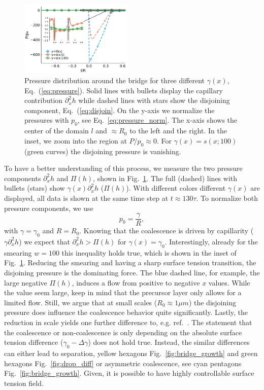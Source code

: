 \documentclass[twocolumn,amsmath,amssymb,showpacs,pre,nofootinbib,superscriptaddress]{revtex4-1} %
\begin{document}
\begin{figure}
    \centering
    \includegraphics[width=0.48\textwidth]{Figures/pressures_three_gam_end.pdf}
    \caption{Pressure distribution around the bridge for three different $\gamma(x)$, Eq.~(\ref{eq:pressure}).
    Solid lines with bullets display the capillary contribution $\partial_x^2 h$ while dashed lines with stars show the disjoining component, Eq.~(\ref{eq:disjoin}.
    On the y-axis we normalize the pressures with $p_0$, see Eq.~\ref{eq:pressure_norm}.
    The x-axis shows the center of the domain $l$ and $\approx R_0$ to the left and the right.
    In the inset, we zoom into the region at $P/p_0 \approx 0$. 
    For $\gamma(x) = s(x;100)$ (green curves) the disjoining pressure is vanishing.}
    \label{fig:pressures}
\end{figure}
To have a better understanding of this process, we measure the two pressure components $\partial_x^2 h$ and $\Pi(h)$, shown in Fig.~\ref{fig:pressures}.
The full (dashed) lines with bullets (stars) show $\gamma(x)\partial_x^2 h$ ($\Pi(h)$). 
With different colors different $\gamma(x)$ are displayed, all data is shown at the same time step at $t\approx 130\tau$.
To normalize both pressure components, we use 
\begin{equation}\label{eq:pressure_norm}
    p_0 = \frac{\gamma}{R},
\end{equation}
with $\gamma = \gamma_0$ and $R = R_0$.
Knowing that the coalescence is driven by capillarity ($\gamma\partial_x^2 h$) we expect that $\partial_x^2 h > \Pi(h)$ for $\gamma(x) = \gamma_0$.
Interestingly, already for the smearing $w=100$ this inequality holds true, which is shown in the inset of Fig.~\ref{fig:pressures}.
Reducing the smearing and having a sharp surface tension transition, the disjoining pressure is the dominating force.
The blue dashed line, for example, the large negative $\Pi(h)$, induces a flow from positive to negative $x$ values.
While the value seem large, keep in mind that the precursor layer only allows for a limited flow.
Still, we argue that at small scales ($R_0 \approx 1\mu m$) the disjoining pressure does influence the coalescence behavior quite significantly.
Lastly, the reduction in scale yields one further difference to, e.g. ref.~\cite{karpitschka2014sharp}.
The statement that the coalescence or non-coalescence is only depending on the absolute surface tension difference ($\gamma_0-\Delta\gamma$) does not hold true.
Instead, the similar differences can either lead to separation, yellow hexagons Fig.~\ref{fig:bridge_growth} and green hexagons Fig.~\ref{fig:drop_diff} or asymmetric coalescence, see cyan pentagons Fig.~\ref{fig:bridge_growth}.
Given, it is possible to have highly controllable surface tension field.
\end{document}
